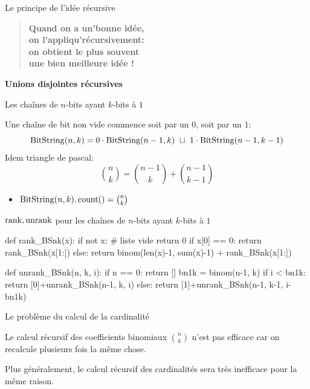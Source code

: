 \documentclass{beamer}
\begin{document}
\begin{frame}{Le principe de l'idée récursive}

  \begin{verse}\bf\color{blue}\LARGE
    Quand on a un'bonne idée, \\
    on l'appliqu'récursivement: \\
    on obtient le plus souvent\\
    une bien meilleure idée !
  \end{verse}
  \pause\bigskip

  \begin{center}
  \bf\LARGE Unions disjointes récursives
  \end{center}
\end{frame}

\begin{frame}{Les chaînes de $n$-bits ayant $k$-bits à $1$}

  Une chaîne de bit non vide commence soit par un $0$, soit par un $1$:
  $$\BS(n, k) = 0\cdot\BS(n-1, k)\ \sqcup\ 1\cdot\BS(n-1, k-1)$$
  Idem triangle de pascal:
  $$\binom{n}{k} = \binom{n-1}{k} + \binom{n-1}{k-1}$$
  \begin{itemize}
  \item $\operatorname{BitString}(n, k).\operatorname{count}() = \binom{n}{k}$ 
  \end{itemize}
\end{frame}

\begin{frame}[fragile]{$\operatorname{rank}, \operatorname{unrank}$ pour les chaînes de $n$-bits ayant
    $k$-bits à $1$}

\small
\begin{listing}{1}
def rank_BSnk(x):
    if not x:        # liste vide
        return 0
    if x[0] == 0:
        return rank_BSnk(x[1:])
    else:
        return binom(len(x)-1, sum(x)-1) + rank_BSnk(x[1:])

def unrank_BSnk(n, k, i):
    if n == 0:
        return []
    bn1k = binom(n-1, k)
    if i < bn1k:
        return [0]+unrank_BSnk(n-1, k, i)
    else:
        return [1]+unrank_BSnk(n-1, k-1, i-bn1k)
\end{listing}
\end{frame}


\begin{frame}{Le problème du calcul de la cardinalité}

  \begin{PROBLEM}
    Le calcul récursif des coefficients binomiaux $\binom{n}{k}$ n'est pas
    efficace car on recalcule plusieurs fois la même chose.
    \medskip

    Plus généralement, le calcul récursif des cardinalités sera très
    inefficace pour la même raison.
  \end{PROBLEM}
\end{frame}
\end{document}
